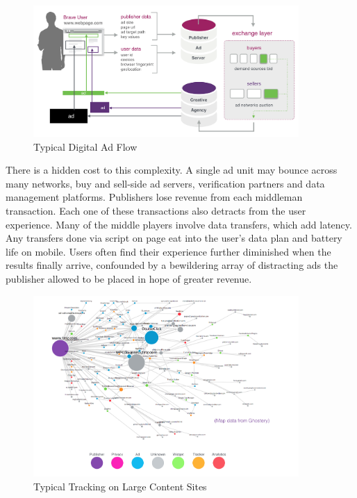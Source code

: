 \documentclass[11pt]{article}
\begin{document}
\begin{figure}
\begin{center}
\includegraphics[width=0.9\textwidth]{typical_display_adflow.png}
\caption{Typical Digital Ad Flow}
\end{center}
\end{figure}

There is a hidden cost to this complexity. A single ad unit may bounce across many networks, buy and sell-side ad servers, verification partners and data management platforms. Publishers lose revenue from each middleman transaction. Each one of these transactions also detracts from the user experience. Many of the middle players involve data transfers, which add latency. Any transfers done via script on page eat into the user's data plan and battery life on mobile. Users often find their experience further diminished when the results finally arrive, confounded by a bewildering array of distracting ads the publisher allowed to be placed in hope of greater revenue. 

\begin{figure}
\begin{center}
\includegraphics[width=0.9\textwidth]{tracking_map.png}
\caption{Typical Tracking on Large Content Sites}
\end{center}
\end{figure}
\end{document}
